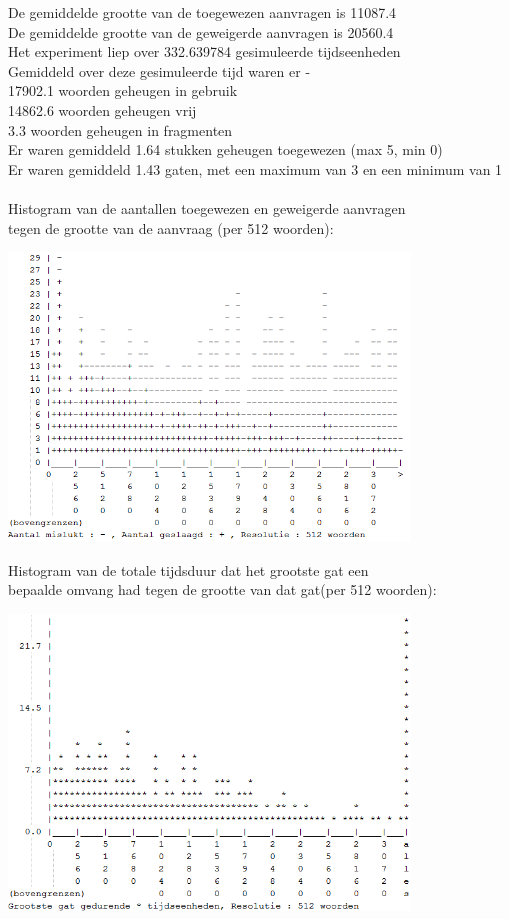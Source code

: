 \documentclass[a4paper]{article}
\begin{document}
			De gemiddelde grootte van de toegewezen aanvragen is 11087.4\\
			De gemiddelde grootte van de geweigerde aanvragen is 20560.4\\
			Het experiment liep over 332.639784 gesimuleerde tijdseenheden\\
			Gemiddeld over deze gesimuleerde tijd waren er - \\
			 17902.1 woorden geheugen in gebruik\\
			 14862.6 woorden geheugen vrij\\
			     3.3 woorden geheugen in fragmenten\\
			Er waren gemiddeld     1.64 stukken geheugen toegewezen (max 5, min 0)\\
			Er waren gemiddeld     1.43 gaten, met een maximum van 3 en een minimum van 1\\
			\\
			Histogram van de aantallen toegewezen en geweigerde aanvragen\\
			tegen de grootte van de aanvraag (per 512 woorden):
			\begin{center}
				\includegraphics[width=0.8\textwidth]{wf1.png}
			\end{center}
			Histogram van de totale tijdsduur dat het grootste gat een\\
			bepaalde omvang had tegen de grootte van dat gat(per 512 woorden):
			\begin{center}
				\includegraphics[width=0.8\textwidth]{wf2.png}
			\end{center}
\end{document}
